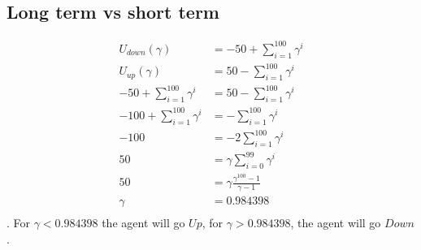 \documentclass[fleqn,12pt]{scrartcl}
\begin{document}
 \subsection{Long term vs short term}
 \begin{align*}
	 U_{down}(\gamma) &= -50 + \sum_{i=1}^{100} \gamma^i\\
	 U_{up}(\gamma) &= 50 - \sum_{i=1}^{100} \gamma^i\\
-50 + \sum_{i=1}^{100} \gamma^i&= 50 - \sum_{i=1}^{100} \gamma^i\\
-100 + \sum_{i=1}^{100} \gamma^i&= - \sum_{i=1}^{100} \gamma^i\\
-100 &= - 2\sum_{i=1}^{100} \gamma^i\\
	 50 &= \gamma \sum_{i=0}^{99} \gamma^{i}\\
	 50 &= \gamma \frac{\gamma^{100}-1}{\gamma -1}\\
	 \gamma &= 0.984398\\
 \end{align*}
 .
 For $\gamma < 0.984398$ the agent will go $Up$, for $\gamma > 0.984398$, the agent will go $Down$.
\end{document}
